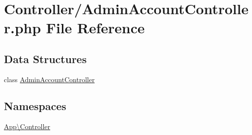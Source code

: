 \hypertarget{_admin_account_controller_8php}{}\section{Controller/\+Admin\+Account\+Controller.php File Reference}
\label{_admin_account_controller_8php}
\subsection*{Data Structures}
\begin{DoxyCompactItemize}
\item 
class \mbox{\hyperlink{class_app_1_1_controller_1_1_admin_account_controller}{Admin\+Account\+Controller}}
\end{DoxyCompactItemize}
\subsection*{Namespaces}
\begin{DoxyCompactItemize}
\item 
 \mbox{\hyperlink{namespace_app_1_1_controller}{App\textbackslash{}\+Controller}}
\end{DoxyCompactItemize}
